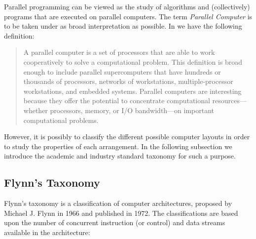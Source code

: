 \documentclass[a4paper,12pt,english]{report}
\begin{document}
Parallel programming can be viewed as the study of algorithms and (collectively) programs that are executed on parallel computers. The term \emph{Parallel Computer} is to be taken under as broad interpretation as possible. In \cite{parallel} we have the following definition:

\begin{quote}
A  parallel computer is a set of processors that are able to work cooperatively to solve a computational problem. This definition is broad enough to include parallel supercomputers that have hundreds or thousands of processors, networks of workstations, multiple-processor workstations, and embedded systems. Parallel computers are interesting because they offer the potential to concentrate computational resources---whether processors, memory, or I/O bandwidth---on important computational problems. 
\end{quote}

However, it is possibly to classify the different possible computer layouts in order  to study the properties of each arrangement. In the following subsection we introduce the academic and industry standard taxonomy for such a purpose.

\subsection{Flynn's Taxonomy}

Flynn's taxonomy is a classification of computer architectures, proposed by Michael J. Flynn in 1966 and published in 1972\cite{flynn}. The classifications are based upon the number of concurrent instruction (or control) and data streams available in the architecture:
\end{document}
